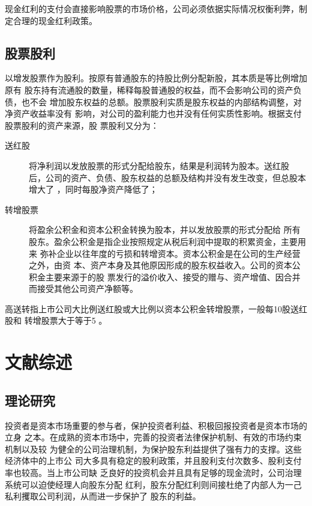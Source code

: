 \documentclass[../main]{subfiles}
\begin{document}
现金红利的支付会直接影响股票的市场价格，公司必须依据实际情况权衡利弊，制
定合理的现金红利政策。

\subsection{股票股利}%
\label{sub:stock_dividend}

以增发股票作为股利。按原有普通股东的持股比例分配新股，其本质是等比例增加原有
股东持有流通股的数量，稀释每股普通股的权益，而不会影响公司的资产负债，也不会
增加股东权益的总额。股票股利实质是股东权益的内部结构调整，对净资产收益率没有
影响，对公司的盈利能力也并没有任何实质性影响。根据支付股票股利的资产来源，股
票股利又分为：

\begin{description}
  \item[送红股]将净利润以发放股票的形式分配给股东，结果是利润转为股本。送红股
    后，公司的资产、负债、股东权益的总额及结构并没有发生改变，但总股本增大了
    ，同时每股净资产降低了；
  \item[转增股票]将盈余公积金和资本公积金转换为股本，并以发放股票的形式分配给
    所有股东。盈余公积金是指企业按照规定从税后利润中提取的积累资金，主要用来
    弥补企业以往年度的亏损和转增资本。资本公积金是在公司的生产经营之外，由资
    本、资产本身及其他原因形成的股东权益收入。公司的资本公积金主要来源于的股
    票发行的溢价收入、接受的赠与、资产增值、因合并而接受其他公司资产净额等。
\end{description}

高送转指上市公司大比例送红股或大比例以资本公积金转增股票，一般每10股送红股和
转增股票大于等于5 。

\section{文献综述}%
\label{sec:document}

\subsection{理论研究}%
\label{sub:theorem}

投资者是资本市场重要的参与者，保护投资者利益、积极回报投资者是资本市场的立身
之本。在成熟的资本市场中，完善的投资者法律保护机制、有效的市场约束机制以及较
为健全的公司治理机制，为保护股东利益提供了强有力的支撑。这些经济体中的上市公
司大多具有稳定的股利政策，并且股利支付次数多、股利支付率也较高。当上市公司缺
乏良好的投资机会并且具有足够的现金流时，公司治理系统可以迫使经理人向股东分配
红利，股东分配红利则间接杜绝了内部人为一己私利攫取公司利润，从而进一步保护了
股东的利益。
\end{document}
